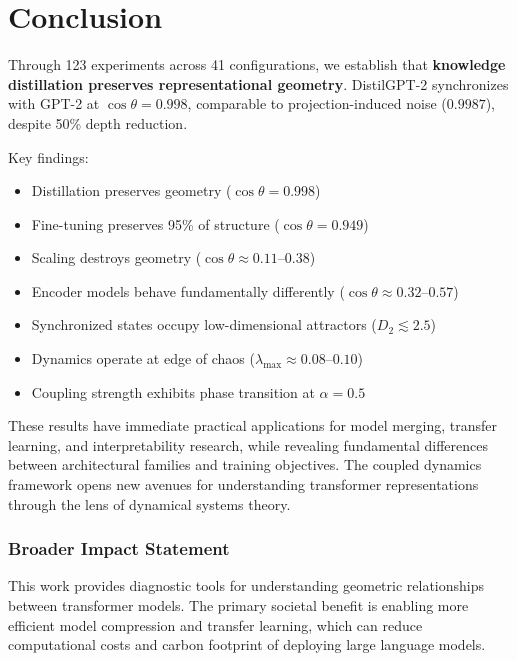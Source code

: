 \documentclass[10pt]{article} %
\theoremstyle{plain}
\theoremstyle{definition}
\theoremstyle{remark}
\begin{document}
\section{Conclusion}

Through 123 experiments across 41 configurations, we establish that \textbf{knowledge distillation preserves representational geometry}. DistilGPT-2 synchronizes with GPT-2 at $\cos \theta = 0.998$, comparable to projection-induced noise ($0.9987$), despite 50\% depth reduction.

Key findings:
\begin{itemize}
    \item Distillation preserves geometry ($\cos \theta = 0.998$)
    \item Fine-tuning preserves 95\% of structure ($\cos \theta = 0.949$)
    \item Scaling destroys geometry ($\cos \theta \approx 0.11$--$0.38$)
    \item Encoder models behave fundamentally differently ($\cos \theta \approx 0.32$--$0.57$)
    \item Synchronized states occupy low-dimensional attractors ($D_2 \lesssim 2.5$)
    \item Dynamics operate at edge of chaos ($\lambda_{\max} \approx 0.08$--$0.10$)
    \item Coupling strength exhibits phase transition at $\alpha = 0.5$
\end{itemize}

These results have immediate practical applications for model merging, transfer learning, and interpretability research, while revealing fundamental differences between architectural families and training objectives. The coupled dynamics framework opens new avenues for understanding transformer representations through the lens of dynamical systems theory.

\subsubsection*{Broader Impact Statement}
This work provides diagnostic tools for understanding geometric relationships between transformer models. The primary societal benefit is enabling more efficient model compression and transfer learning, which can reduce computational costs and carbon footprint of deploying large language models. 
\end{document}

